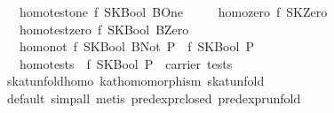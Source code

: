 \begin{isabellebody}
\ \ \ homo{}test{}one{}\ {}f\ {}SKBool\ BOne{}\ {}\ {}{}\isanewline
\ \ \ homo{}zero{}\ {}f\ SKZero\ {}\ {}{}\isanewline
\ \ \ homo{}test{}zero{}\ {}f\ {}SKBool\ BZero{}\ {}\ {}{}\isanewline
\ \ \ homo{}not{}\ {}f\ {}SKBool\ {}BNot\ P{}{}\ {}\ {}{}f\ {}SKBool\ P{}{}{}\isanewline
\ \ \ homo{}tests{}\ {}\ f\ {}SKBool\ P{}\ {}\ carrier\ tests{}\isanewline
\isanewline
{}\isamarkupfalse%
\ skat{}unfold{}homo{}\ {}kat{}homomorphism\ skat{}unfold{}\isanewline
%
\isadelimproof
\ \ %
\endisadelimproof
%
\isatagproof
{}\isamarkupfalse%
\ {}default{}\ simp{}all{}\ metis\ pred{}expr{}closed\ pred{}expr{}unfold{}%

\end{isabellebody}
